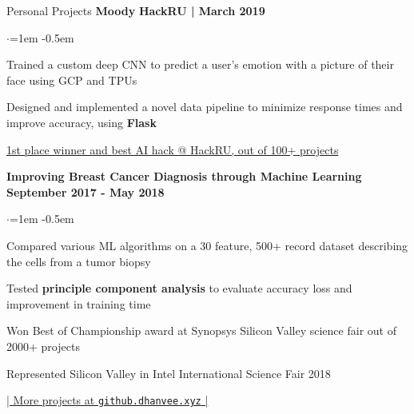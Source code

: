 \documentclass[mm,centered]{resume} %
\begin{document}
\begin{rSection}{Personal Projects}
{\bf Moody}  \hfill {\bf HackRU | March 2019}
 \begin{list}{$\cdot$}{\leftmargin=1em} %
   \itemsep -0.5em \vspace{-0.5em} %
	\item Trained a custom deep CNN to predict a user’s emotion with a picture of their face using GCP and TPUs
	\item Designed and implemented a novel data pipeline to minimize response times and improve accuracy, using \textbf{Flask}
	\item \underline{1st place winner and best AI hack @ HackRU, out of 100+ projects}
  \end{list}

{\bf Improving Breast Cancer Diagnosis through Machine Learning} \hfill {\bf September 2017 - May 2018}
 \begin{list}{$\cdot$}{\leftmargin=1em} %
   \itemsep -0.5em \vspace{-0.5em} %
	\item Compared various ML algorithms on a 30 feature, 500+ record dataset describing the cells from a tumor biopsy
	\item Tested \textbf{principle component analysis} to evaluate accuracy loss and improvement in training time
	\item Won Best of Championship award at Synopsys Silicon Valley science fair out of 2000+ projects
	\item Represented Silicon Valley in Intel International Science Fair 2018
  \end{list}

\vspace{-1.25mm}
\begin{center}
	\href{http://github.dhanvee.xyz}{| More projects at \texttt{github.dhanvee.xyz} |}
\end{center}
\vspace{-2mm}
\end{rSection}
\end{document}
